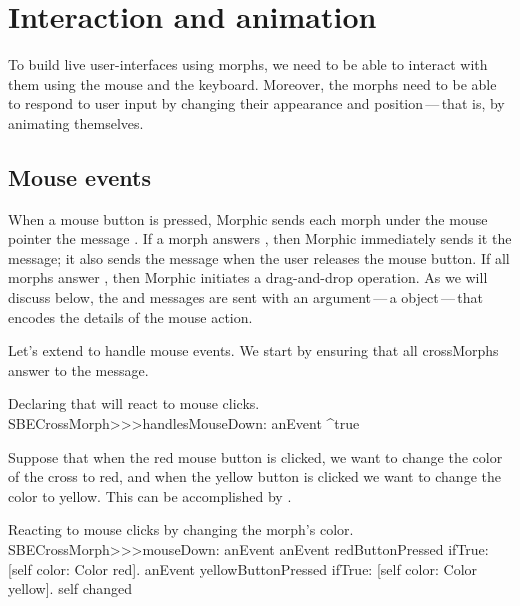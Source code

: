 \documentclass[a4paper,10pt,twoside]{book}
\begin{document}


\section{Interaction and animation}

To build live user-interfaces using morphs, we need to be able to interact with them using the mouse and the keyboard.
Moreover, the morphs need to be able to respond to user input by changing their appearance and position\,---\,that is, by animating themselves.


\subsection{Mouse events}

When a mouse button is pressed, Morphic sends each morph under the mouse pointer the message .
If a morph answers , then Morphic immediately sends it the  message; it also sends the  message when the user releases the mouse button.
If all morphs answer , then Morphic initiates a drag-and-drop operation.
As we will discuss below, the  and  messages are sent with an argument\,---\,a  object\,---\,that encodes the details of the mouse action.

Let's extend  to handle mouse events.  
We start by ensuring that all crossMorphs answer  to the  message. 

\begin{method}{Declaring that  will react to mouse clicks.}
SBECrossMorph>>>handlesMouseDown: anEvent
	^true
\end{method}

Suppose that when the red mouse button is clicked, we want to change the color of the cross to red, and when the yellow button is clicked we want to change the color to yellow.
This can be accomplished by .

\begin{method}[mouseDown]{Reacting to mouse clicks by changing the morph's color.}
SBECrossMorph>>>mouseDown: anEvent
	anEvent redButtonPressed
		ifTrue: [self color: Color red].
	anEvent yellowButtonPressed
		ifTrue: [self color: Color yellow].
	self changed
\end{method}
\end{document}
